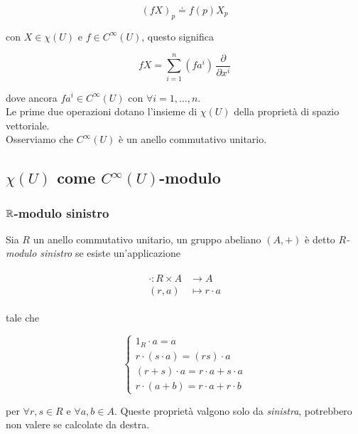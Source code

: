 \begin{equation}
	(f X)_{p} \doteq f(p) X_{p}
\end{equation}

con $ X \in \chi(U) $ e $ f \in C^{\infty}(U) $, questo significa

\begin{equation}
	f X = \sum_{i=1}^{n} (f a^{i}) \, \dfrac{\partial}{\partial x^{i}}
\end{equation}

dove ancora $ f a^{i} \in C^{\infty}(U) $ con $ \forall i=1,\dots,n $.\\
Le prime due operazioni dotano l'insieme di $ \chi(U) $ della proprietà di spazio vettoriale.\\
Osserviamo che $ C^{\infty}(U) $ è un anello commutativo unitario.

\subsection{$ \chi(U) $ come $ C^{\infty}(U) $-modulo}

\subsubsection{$ \mathbb{R} $-modulo sinistro}

Sia $ R $ un anello commutativo unitario, un gruppo abeliano $ (A,+) $ è detto $ R $\textit{-modulo sinistro} se esiste un'applicazione

\begin{align}
	\begin{split}
		\cdot : R \times A &\to A\\
		(r,a) &\mapsto r \cdot a
	\end{split}
\end{align}

tale che

\begin{equation}
	\begin{cases}
		1_{R} \cdot a = a\\
		r \cdot (s \cdot a) = (r s) \cdot a\\
		(r+s) \cdot a = r \cdot a + s \cdot a\\
		r \cdot (a+b) = r \cdot a + r \cdot b
	\end{cases}
\end{equation}

per $ \forall r,s \in R $ e $ \forall a,b \in A $. Queste proprietà valgono solo da \textit{sinistra}, potrebbero non valere se calcolate da destra.

